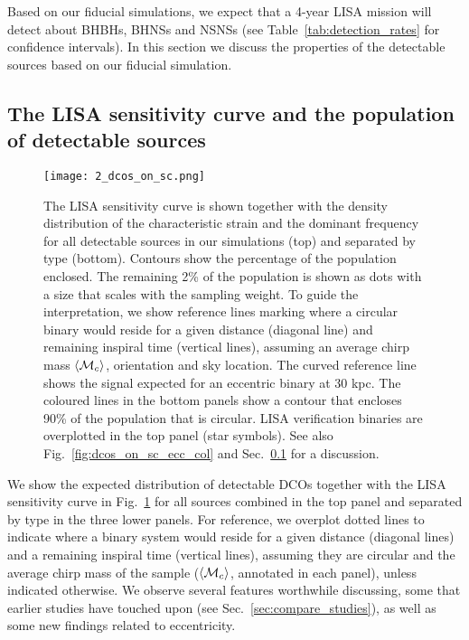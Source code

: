 Based on our fiducial simulations, we expect that a 4-year LISA mission will detect about \BHBHFourYear{} BHBHs, \BHNSFourYear{} BHNSs and \NSNSFourYear{} NSNSs (see Table~\ref{tab:detection_rates} for confidence intervals). In this section we discuss the properties of the detectable sources based on our fiducial simulation.   
\subsection{The LISA sensitivity curve and the population of detectable sources}\label{sec:dcos_on_sc}
\begin{figure*}[p]
    \centering
    \texttt{[image: 2\_dcos\_on\_sc.png]}
    \caption{The LISA sensitivity curve is shown together with the density distribution of the characteristic strain and the dominant frequency for all detectable sources in our simulations (top) and separated by type (bottom). Contours show the percentage of the population enclosed. The remaining 2\% of the population is shown as dots with a size that scales with the sampling weight. To guide the interpretation, we show reference lines marking where a circular binary would reside for a given distance (diagonal line) and remaining inspiral time (vertical lines), assuming an average chirp mass $\left\langle\mathcal{M}_c\right\rangle$, orientation and sky location. The curved reference line shows the signal expected for an eccentric binary at 30 kpc. The coloured lines in the bottom panels show a contour that encloses 90\% of the population that is circular. LISA verification binaries are overplotted in the top panel (star symbols).  See also Fig.~\ref{fig:dcos_on_sc_ecc_col} and Sec.~\ref{sec:dcos_on_sc} for a discussion.}
    \label{fig:dcos_on_sc}
\end{figure*}
We show the expected distribution of detectable DCOs together with the LISA sensitivity curve in Fig.~\ref{fig:dcos_on_sc} for all sources combined in the top panel and separated by type in the three lower panels. For reference, we overplot dotted lines to indicate where a binary system would reside for a given distance (diagonal lines) and a remaining inspiral time (vertical lines), assuming they are circular and the average chirp mass of the sample ($\left\langle\mathcal{M}_c\right\rangle$, annotated in each panel), unless indicated otherwise. We observe several features worthwhile discussing, some that earlier studies have touched upon (see Sec.~\ref{sec:compare_studies}), as well as some new findings related to eccentricity.

